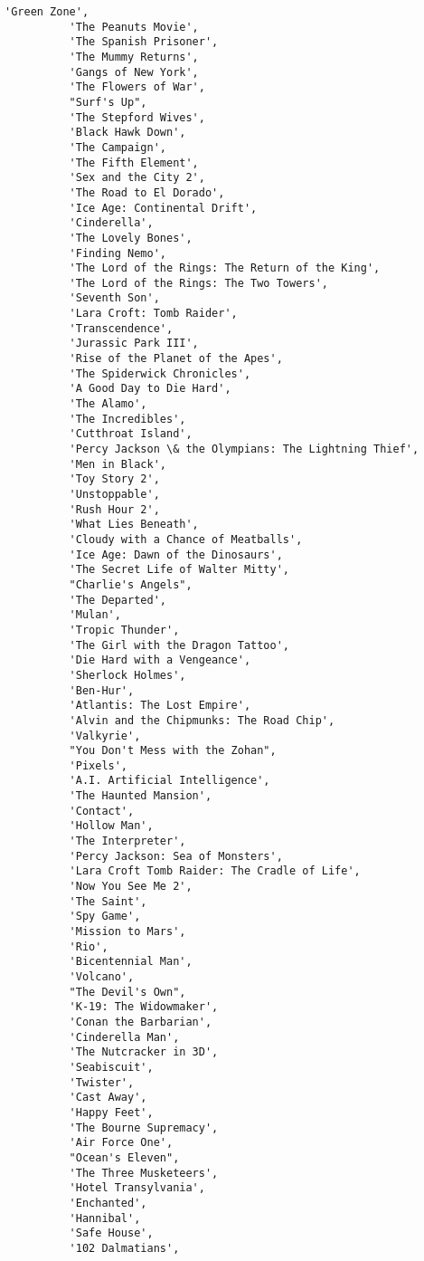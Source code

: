 \documentclass[11pt]{article}
\begin{document}
\begin{Verbatim}[commandchars=\\\{\}]
          'Green Zone',
          'The Peanuts Movie',
          'The Spanish Prisoner',
          'The Mummy Returns',
          'Gangs of New York',
          'The Flowers of War',
          "Surf's Up",
          'The Stepford Wives',
          'Black Hawk Down',
          'The Campaign',
          'The Fifth Element',
          'Sex and the City 2',
          'The Road to El Dorado',
          'Ice Age: Continental Drift',
          'Cinderella',
          'The Lovely Bones',
          'Finding Nemo',
          'The Lord of the Rings: The Return of the King',
          'The Lord of the Rings: The Two Towers',
          'Seventh Son',
          'Lara Croft: Tomb Raider',
          'Transcendence',
          'Jurassic Park III',
          'Rise of the Planet of the Apes',
          'The Spiderwick Chronicles',
          'A Good Day to Die Hard',
          'The Alamo',
          'The Incredibles',
          'Cutthroat Island',
          'Percy Jackson \& the Olympians: The Lightning Thief',
          'Men in Black',
          'Toy Story 2',
          'Unstoppable',
          'Rush Hour 2',
          'What Lies Beneath',
          'Cloudy with a Chance of Meatballs',
          'Ice Age: Dawn of the Dinosaurs',
          'The Secret Life of Walter Mitty',
          "Charlie's Angels",
          'The Departed',
          'Mulan',
          'Tropic Thunder',
          'The Girl with the Dragon Tattoo',
          'Die Hard with a Vengeance',
          'Sherlock Holmes',
          'Ben-Hur',
          'Atlantis: The Lost Empire',
          'Alvin and the Chipmunks: The Road Chip',
          'Valkyrie',
          "You Don't Mess with the Zohan",
          'Pixels',
          'A.I. Artificial Intelligence',
          'The Haunted Mansion',
          'Contact',
          'Hollow Man',
          'The Interpreter',
          'Percy Jackson: Sea of Monsters',
          'Lara Croft Tomb Raider: The Cradle of Life',
          'Now You See Me 2',
          'The Saint',
          'Spy Game',
          'Mission to Mars',
          'Rio',
          'Bicentennial Man',
          'Volcano',
          "The Devil's Own",
          'K-19: The Widowmaker',
          'Conan the Barbarian',
          'Cinderella Man',
          'The Nutcracker in 3D',
          'Seabiscuit',
          'Twister',
          'Cast Away',
          'Happy Feet',
          'The Bourne Supremacy',
          'Air Force One',
          "Ocean's Eleven",
          'The Three Musketeers',
          'Hotel Transylvania',
          'Enchanted',
          'Hannibal',
          'Safe House',
          '102 Dalmatians',

\end{Verbatim}
\end{document}

